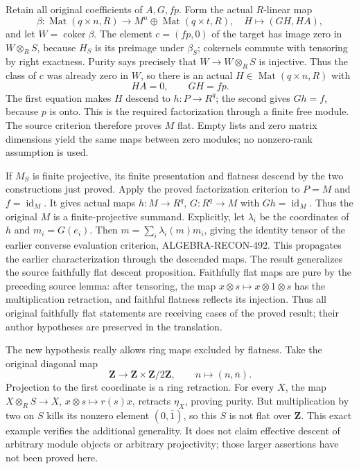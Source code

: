 Retain all original coefficients of \(A,G,fp\). Form the actual \(R\)-linear map \[
\beta:\operatorname{Mat}(q\times n,R)\longrightarrow
M^n\oplus\operatorname{Mat}(q\times t,R),
\quad H\longmapsto(GH,HA),
\] and let \(W=\operatorname{coker}\beta\). The element \(c=(fp,0)\) of the target has image zero in \(W\otimes_RS\), because \(H_S\) is its preimage under \(\beta_S\); cokernels commute with tensoring by right exactness. Purity says precisely that \(W\to W\otimes_RS\) is injective. Thus the class of \(c\) was already zero in \(W\), so there is an actual \(H\in\operatorname{Mat}(q\times n,R)\) with \[
HA=0,\qquad GH=fp.
\] The first equation makes \(H\) descend to \(h:P\to R^q\); the second gives \(Gh=f\), because \(p\) is onto. This is the required factorization through a finite free module. The source criterion therefore proves \(M\) flat. Empty lists and zero matrix dimensions yield the same maps between zero modules; no nonzero-rank assumption is used.

If \(M_S\) is finite projective, its finite presentation and flatness descend by the two constructions just proved. Apply the proved factorization criterion to \(P=M\) and \(f=\operatorname{id}_M\). It gives actual maps \(h:M\to R^q\), \(G:R^q\to M\) with \(Gh=\operatorname{id}_M\). Thus the original \(M\) is a finite-projective summand. Explicitly, let \(\lambda_i\) be the coordinates of \(h\) and \(m_i=G(e_i)\). Then \(m=\sum_i\lambda_i(m)m_i\), giving the identity tensor of the earlier converse evaluation criterion, ALGEBRA-\AlgebraIdentifierBreak{}RECON-\AlgebraIdentifierBreak{}492. This propagates the earlier characterization through the descended maps. The result generalizes the source faithfully flat descent proposition. Faithfully flat maps are pure by the preceding source lemma: after tensoring, the map \(x\otimes s\mapsto x\otimes1\otimes s\) has the multiplication retraction, and faithful flatness reflects its injection. Thus all original faithfully flat statements are receiving cases of the proved result; their author hypotheses are preserved in the translation.

The new hypothesis really allows ring maps excluded by flatness. Take the original diagonal map \[
\mathbf Z\longrightarrow\mathbf Z\times\mathbf Z/2\mathbf Z,
\qquad n\longmapsto(n,\overline n).
\] Projection to the first coordinate is a ring retraction. For every \(X\), the map \(X\otimes_RS\to X\), \(x\otimes s\mapsto r(s)x\), retracts \(\eta_X\), proving purity. But multiplication by two on \(S\) kills its nonzero element \((0,\overline1)\), so this \(S\) is not flat over \(\mathbf Z\). This exact example verifies the additional generality. It does not claim effective descent of arbitrary module objects or arbitrary projectivity; those larger assertions have not been proved here.

